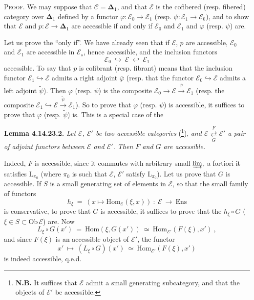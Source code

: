 \documentclass[11pt]{article}
\newcommand{\printedpage}[1]{\marginpar{\footnotesize p.~#1}}
\newcommand{\msp}[1]{\marginpar{\footnotesize [#1]}}
\newcommand{\bDelta}{\boldsymbol{\Delta}}
\newcommand{\Ens}{\mathrm{Ens}}
\newcommand{\Ob}{\mathrm{Ob}\,}
\newcommand{\Hom}{\mathrm{Hom}}
\begin{document}
\textsc{Proof.} We may suppose that $\mathcal{C}=\bDelta_1$, and that $\mathcal{E}$ is the cofibered (resp. fibered) category over $\bDelta_1$ defined by a functor $\varphi:\mathcal{E}_0\longrightarrow\mathcal{E}_1$ (resp. $\psi:\mathcal{E}_1\longrightarrow\mathcal{E}_0$), and to show that $\mathcal{E}$ and $p:\mathcal{E}\longrightarrow\bDelta_1$ are accessible if and only if $\mathcal{E}_0$ and $\mathcal{E}_1$ and $\varphi$ (resp. $\psi$) are.

\msp{page 411}

Let us prove the ``only if''. We have already seen that if $\mathcal{E}$, $p$ are accessible, $\mathcal{E}_0$ and $\mathcal{E}_1$ are accessible in $\mathcal{E}_s$, hence accessible, and the inclusion functors %
\[
\mathcal{E}_0\ \hookrightarrow\ \mathcal{E}\ \hookleftarrow\ \mathcal{E}_1
\]
accessible. To say that $p$ is cofibrant (resp. fibrant) means that the inclusion functor $\mathcal{E}_1\hookrightarrow\mathcal{E}$ admits a right adjoint $\bar{\varphi}$ (resp. that the functor $\mathcal{E}_0\hookrightarrow\mathcal{E}$ admits a left adjoint $\tilde{\psi}$). Then $\varphi$ (resp. $\psi$) is the composite $\mathcal{E}_0\longrightarrow\mathcal{E}\xrightarrow{\;\bar{\varphi}\;}\mathcal{E}_1$ (resp. the composite $\mathcal{E}_1\hookrightarrow\mathcal{E}\xrightarrow{\;\tilde{\psi}\;}\mathcal{E}_1$). So to prove that $\varphi$ (resp. $\psi$) is accessible, it suffices to prove that $\bar{\varphi}$ (resp. $\tilde{\psi}$) is. This is a special case of the %

\textbf{Lemma 4.14.23.2.} \textit{Let $\mathcal{E}$, $\mathcal{E}'$ be two accessible categories} (\footnote[172]{\textbf{N.B.} It suffices that $\mathcal{E}$ admit a small generating subcategory, and that the objects of $\mathcal{E}'$ be accessible.}), \textit{and $\mathcal{E}\underset{G}{\overset{F}{\rightleftarrows}}\mathcal{E}'$ a pair of adjoint functors between $\mathcal{E}$ and $\mathcal{E}'$. Then $F$ and $G$ are accessible.}

\msp{page 412}

Indeed, $F$ is accessible, since it commutes with arbitrary small $\varinjlim$, a fortiori it satisfies $\mathrm{L}_{\pi_0}$ (where $\pi_0$ is such that $\mathcal{E}$, $\mathcal{E}'$ satisfy $\mathrm{L}_{\pi_0}$). Let us prove that $G$ is accessible. If $S$ is a
\printedpage{156}
small generating set of elements in $\mathcal{E}$, so that the small family of functors
\[
h_\xi\ =\ (x\longmapsto\Hom_{\mathcal{E}}(\xi,x))\ :\ \mathcal{E}\ \longrightarrow\ \Ens
\]
is conservative, to prove that $G$ is accessible, it suffices to prove that the $h_\xi\circ G$ ($\xi\in S\subset\Ob\mathcal{E}$) are. Now
\[
L_\xi\circ G(x')\ =\ \Hom(\xi,G(x'))\ \simeq\ \Hom_{\mathcal{E}'}(F(\xi),x')\ , %
\]
and since $F(\xi)$ is an accessible object of $\mathcal{E}'$, the functor
\[
x'\ \longmapsto\ (L_\xi\circ G)(x')\ \simeq\ \Hom_{\mathcal{E}'}(F(\xi),x') %
\]
is indeed accessible, q.e.d.
\end{document}

